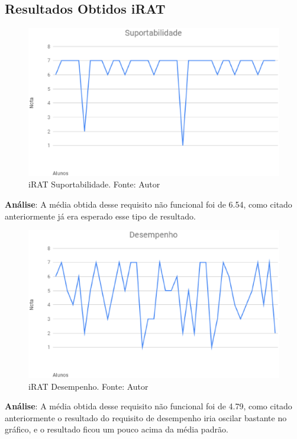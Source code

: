 \subsection{Resultados Obtidos iRAT}

\begin{figure}[H]
	\centering
  \includegraphics[keepaspectratio=true,scale=0.5]{figuras/iRAT_Suportabilidade.eps}
  \caption[iRAT Suportabilidade.]{iRAT Suportabilidade. Fonte: Autor}
\end{figure}

\textbf{Análise}: A média obtida desse requisito não funcional foi de 6.54, como citado anteriormente já era
esperado esse tipo de resultado.

\begin{figure}[H]
	\centering
  \includegraphics[keepaspectratio=true,scale=0.5]{figuras/iRAT_Desempenho.eps}
  \caption[iRAT Desempenho.]{iRAT Desempenho. Fonte: Autor}
\end{figure}

\textbf{Análise}: A média obtida desse requisito não funcional foi de 4.79, como citado anteriormente o
resultado do requisito de desempenho iria oscilar bastante no gráfico, e o resultado ficou um pouco acima da média
  padrão.

